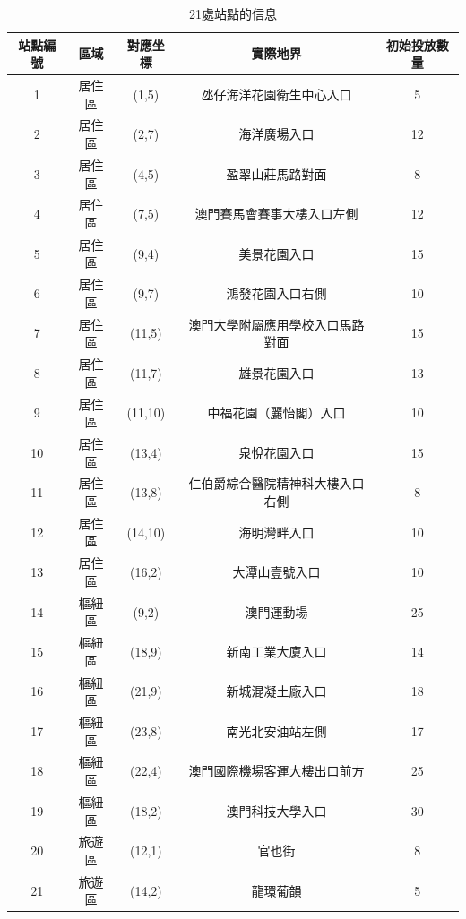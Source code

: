 \begin{table}[H]
    \begin{center}
        \begin{tabular}{ccccc}
        \hline
        站點編號 & 區域 & 對應坐標 & 實際地界 & 初始投放數量 \\
        \hline
        1 & 居住區 & (1,5) & 氹仔海洋花園衛生中心入口 & 5 \\
        2 & 居住區 & (2,7) & 海洋廣場入口 & 12 \\
        3 & 居住區 & (4,5) & 盈翠山莊馬路對面 & 8 \\
        4 & 居住區 & (7,5) & 澳門賽馬會賽事大樓入口左側 & 12 \\
        5 & 居住區 & (9,4) & 美景花園入口 & 15 \\
        6 & 居住區 & (9,7) & 鴻發花園入口右側 & 10 \\
        7 & 居住區 & (11,5) & 澳門大學附屬應用學校入口馬路對面 & 15 \\
        8 & 居住區 & (11,7) & 雄景花園入口 & 13 \\
        9 & 居住區 & (11,10) & 中福花園（麗怡閣）入口 & 10 \\
        10 & 居住區 & (13,4) & 泉悅花園入口 & 15 \\
        11 & 居住區 & (13,8) & 仁伯爵綜合醫院精神科大樓入口右側 & 8 \\
        12 & 居住區 & (14,10) & 海明灣畔入口 & 10 \\
        13 & 居住區 & (16,2) & 大潭山壹號入口 & 10 \\
        14 & 樞紐區 & (9,2) & 澳門運動場 & 25 \\
        15 & 樞紐區 & (18,9) & 新南工業大廈入口 & 14 \\
        16 & 樞紐區 & (21,9) & 新城混凝土廠入口 & 18 \\
        17 & 樞紐區 & (23,8) & 南光北安油站左側 & 17 \\
        18 & 樞紐區 & (22,4) & 澳門國際機場客運大樓出口前方 & 25 \\
        19 & 樞紐區 & (18,2) & 澳門科技大學入口 & 30 \\
        20 & 旅遊區 & (12,1) & 官也街 & 8 \\
        21 & 旅遊區 & (14,2) & 龍環葡韻 & 5 \\
        \hline
        \end{tabular}
    \end{center}
    \caption{21處站點的信息}
\end{table}

